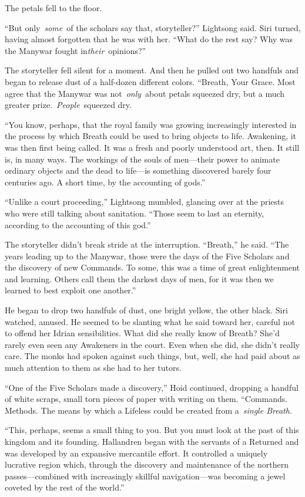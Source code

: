 The petals fell to the floor.

“But only~\textit{some}~of the scholars say that, storyteller?” Lightsong said. Siri turned, having almost forgotten that he was with her. “What do the rest say? Why was the Manywar fought in\textit{their}~opinions?”

The storyteller fell silent for a moment. And then he pulled out two handfuls and began to release dust of a half-dozen different colors. “Breath, Your Grace. Most agree that the Manywar was not~\textit{only}~about petals squeezed dry, but a much greater prize.~\textit{People}~squeezed dry.

“You know, perhaps, that the royal family was growing increasingly interested in the process by which Breath could be used to bring objects to life. Awakening, it was then first being called. It was a fresh and poorly understood art, then. It still is, in many ways. The workings of the souls of men—their power to animate ordinary objects and the dead to life—is something discovered barely four centuries ago. A short time, by the accounting of gods.”

“Unlike a court proceeding,” Lightsong mumbled, glancing over at the priests who were still talking about sanitation. “Those seem to last an eternity, according to the accounting of this god.”

The storyteller didn’t break stride at the interruption. “Breath,” he said. “The years leading up to the Manywar, those were the days of the Five Scholars and the discovery of new Commands. To some, this was a time of great enlightenment and learning. Others call them the darkest days of men, for it was then we learned to best exploit one another.”

He began to drop two handfuls of dust, one bright yellow, the other black. Siri watched, amused. He seemed to be slanting what he said toward her, careful not to offend her Idrian sensibilities. What did she really know of Breath? She’d rarely even seen any Awakeners in the court. Even when she did, she didn’t really care. The monks had spoken against such things, but, well, she had paid about as much attention to them as she had to her tutors.

“One of the Five Scholars made a discovery,” Hoid continued, dropping a handful of white scraps, small torn pieces of paper with writing on them. “Commands. Methods. The means by which a Lifeless could be created from a~\textit{single Breath.}

“This, perhaps, seems a small thing to you. But you must look at the past of this kingdom and its founding. Hallandren began with the servants of a Returned and was developed by an expansive mercantile effort. It controlled a uniquely lucrative region which, through the discovery and maintenance of the northern passes—combined with increasingly skillful navigation—was becoming a jewel coveted by the rest of the world.”

